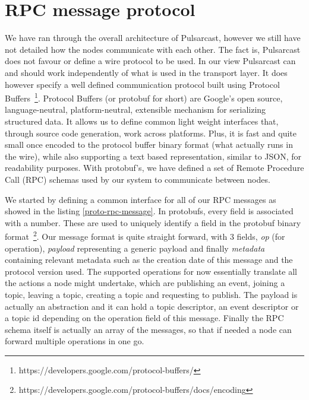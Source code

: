 \section{RPC message protocol}\label{rpc-message}

We have ran through the overall architecture of Pulsarcast, however we still
have not detailed how the nodes communicate with each other. The fact is,
Pulsarcast does not favour or define a wire protocol to be used. In our view
Pulsarcast can and should work independently of what is used in the transport
layer. It does however specify a well defined communication protocol built
using Protocol
Buffers~\footnote{https://developers.google.com/protocol-buffers/}. Protocol
Buffers (or protobuf for short) are Google's open source, language-neutral,
platform-neutral, extensible mechanism for serializing structured data. It
allows us to define common light weight interfaces that, through source code
generation, work across platforms. Plus, it is fast and quite small once
encoded to the protocol buffer binary format (what actually runs in the wire),
while also supporting a text based representation, similar to JSON, for
readability purposes. With protobuf's, we have defined a set of Remote
Procedure Call (RPC) schemas used by our system to communicate between nodes.

We started by defining a common interface for all of our RPC messages as showed
in the listing \ref{proto-rpc-message}. In protobufs, every field is associated
with a number. These are used to uniquely identify a field in the protobuf
binary
format~\footnote{https://developers.google.com/protocol-buffers/docs/encoding}.
Our message format is quite straight forward, with 3 fields, \emph{op} (for
operation), \emph{payload} representing a generic payload and finally
\emph{metadata} containing relevant metadata such as the creation date of this
message and the protocol version used. The supported operations for now
essentially translate all the actions a node might undertake, which are
publishing an event, joining a topic, leaving a topic, creating a topic and
requesting to publish. The payload is actually an abstraction and it can hold a
topic descriptor, an event descriptor or a topic id depending on the operation
field of this message. Finally the RPC schema itself is actually an array of
the messages, so that if needed a node can forward multiple operations in one
go.

